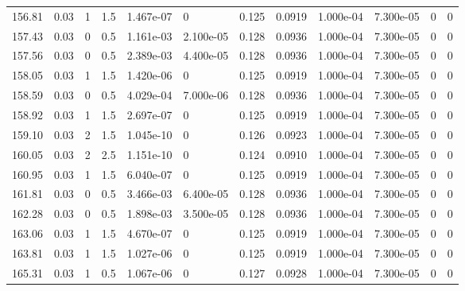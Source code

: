 \documentclass[preview]{standalone}
\begin{document}
{{{{{\begin{tabular}{L{1.2cm}C{1.2cm} C{0.3cm}C{0.5cm} C{1.4cm}C{1.4cm} C{1.4cm}C{1.4cm} C{1.6cm}C{1.6cm} C{1.6cm}C{1.6cm}}
  156.81  &  0.03  & 1     & 1.5 &  1.467e-07  & 0  &  0.125&   0.0919& 1.000e-04 & 7.300e-05   &  0 & 0  \\ 
  157.43  &  0.03  & 0     & 0.5 &  1.161e-03  & 2.100e-05  &  0.128&   0.0936& 1.000e-04 & 7.300e-05   &  0 & 0  \\ 
  157.56  &  0.03  & 0     & 0.5 &  2.389e-03  & 4.400e-05  &  0.128&   0.0936& 1.000e-04 & 7.300e-05   &  0 & 0  \\ 
  158.05  &  0.03  & 1     & 1.5 &  1.420e-06  & 0  &  0.125&   0.0919& 1.000e-04 & 7.300e-05   &  0 & 0  \\ 
  158.59  &  0.03  & 0     & 0.5 &  4.029e-04  & 7.000e-06  &  0.128&   0.0936& 1.000e-04 & 7.300e-05   &  0 & 0  \\ 
  158.92  &  0.03  & 1     & 1.5 &  2.697e-07  & 0  &  0.125&   0.0919& 1.000e-04 & 7.300e-05   &  0 & 0  \\ 
  159.10  &  0.03  & 2     & 1.5 &  1.045e-10  & 0  &  0.126&   0.0923& 1.000e-04 & 7.300e-05   &  0 & 0  \\ 
  160.05  &  0.03  & 2     & 2.5 &  1.151e-10  & 0  &  0.124&   0.0910& 1.000e-04 & 7.300e-05   &  0 & 0  \\ 
  160.95  &  0.03  & 1     & 1.5 &  6.040e-07  & 0  &  0.125&   0.0919& 1.000e-04 & 7.300e-05   &  0 & 0  \\ 
  161.81  &  0.03  & 0     & 0.5 &  3.466e-03  & 6.400e-05  &  0.128&   0.0936& 1.000e-04 & 7.300e-05   &  0 & 0  \\ 
  162.28  &  0.03  & 0     & 0.5 &  1.898e-03  & 3.500e-05  &  0.128&   0.0936& 1.000e-04 & 7.300e-05   &  0 & 0  \\ 
  163.06  &  0.03  & 1     & 1.5 &  4.670e-07  & 0  &  0.125&   0.0919& 1.000e-04 & 7.300e-05   &  0 & 0  \\ 
  163.81  &  0.03  & 1     & 1.5 &  1.027e-06  & 0  &  0.125&   0.0919& 1.000e-04 & 7.300e-05   &  0 & 0  \\ 
  165.31  &  0.03  & 1     & 0.5 &  1.067e-06  & 0  &  0.127&   0.0928& 1.000e-04 & 7.300e-05   &  0 & 0  \\ 
\hline 
\end{tabular} 

}}}}}
\end{document}
